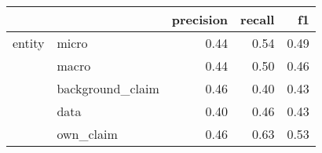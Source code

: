 \begin{tabular}{llrrr}
\toprule
       &           &  precision &  recall &   f1 \\
\midrule
entity & micro &       0.44 &    0.54 & 0.49 \\
       & macro &       0.44 &    0.50 & 0.46 \\
       & background\_claim &       0.46 &    0.40 & 0.43 \\
       & data &       0.40 &    0.46 & 0.43 \\
       & own\_claim &       0.46 &    0.63 & 0.53 \\
\bottomrule
\end{tabular}
